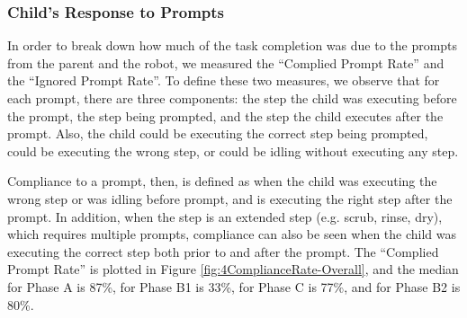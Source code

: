 \subsubsection{Child's Response to Prompts}
In order to break down how much of the task completion was due to the prompts from the parent and the robot, we measured the ``Complied Prompt Rate'' and the ``Ignored Prompt Rate''.  To define these two measures, we observe that for each prompt, there are three components: the step the child was executing before the prompt, the step being prompted, and the step the child executes after the prompt.  Also, the child could be executing the correct step being prompted, could be executing the wrong step, or could be idling without executing any step.

Compliance to a prompt, then, is defined as when the child was executing the wrong step or was idling before prompt, and is executing the right step after the prompt.  In addition, when the step is an extended step (e.g. scrub, rinse, dry), which requires multiple prompts, compliance can also be seen when the child was executing the correct step both prior to and after the prompt.  The ``Complied Prompt Rate'' is plotted in Figure \ref{fig:4ComplianceRate-Overall}, and the median for Phase A is 87\%, for Phase B1 is 33\%, for Phase C is 77\%, and for Phase B2 is 80\%.

